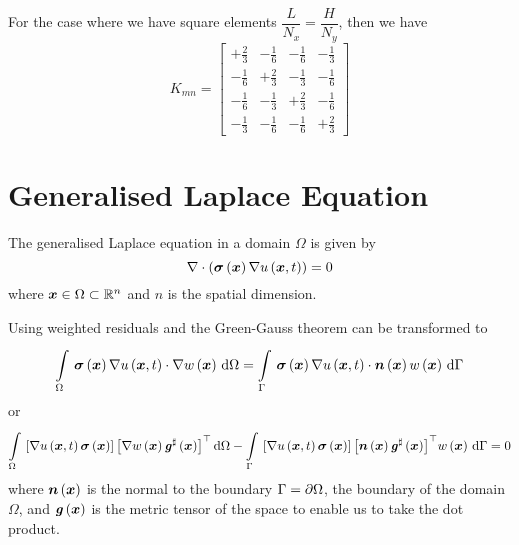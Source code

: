 For the case where we have square elements \ie $\dfrac{L}{N_{x}}=\dfrac{H}{N_{y}}$, then we have
\begin{equation}
  K_{mn}=\begin{bmatrix}
  +\frac{2}{3} & -\frac{1}{6} & -\frac{1}{6} & -\frac{1}{3} \\
  -\frac{1}{6} & +\frac{2}{3} & -\frac{1}{3} & -\frac{1}{6} \\
  -\frac{1}{6} & -\frac{1}{3} & +\frac{2}{3} & -\frac{1}{6} \\
  -\frac{1}{3} & -\frac{1}{6} & -\frac{1}{6} & +\frac{2}{3}
  \end{bmatrix}
  \label{eqn:FEMTwoDLaplaceSquareElementStiffnessMatrix}  
\end{equation}

\section{Generalised Laplace Equation}
\label{sec:ElementStiffnessMatrixGenLaplace}

The generalised Laplace equation in a domain $\Omega$ is given by  \ie
\begin{equation}
  \divergence{}{\pbrac{\fnof{\conductivitytensor}{\vectr{x}}\gradient{}{\fnof{u}{\vectr{x},t}}}}=0
\end{equation}
where $\vectr{x}\in\Omega\subset\rntopology{n}$ and $n$ is the spatial dimension.

Using weighted residuals and the Green-Gauss theorem
 can be transformed to
\begin{equation}
  \gint{\Omega}{}{\dotprod{\fnof{\conductivitytensor}{\vectr{x}}\gradient{}{\fnof{u}{\vectr{x},t}}}
    {\gradient{}{\fnof{w}{\vectr{x}}}}}{\Omega}=
  \gint{\Gamma}{}{\dotprod{\fnof{\conductivitytensor}{\vectr{x}}\gradient{}{\fnof{u}{\vectr{x},t}}}
    {\fnof{\normal}{\vectr{x}}}\fnof{w}{\vectr{x}}}{\Gamma}
\end{equation}
or
\begin{equation}
  \gint{\Omega}{}{\sqbrac{\gradient{}{\fnof{u}{\vectr{x},t}}\fnof{\conductivitytensor}{\vectr{x}}}
    \transpose{\sqbrac{\gradient{}{\fnof{w}{\vectr{x}}}\fnof{\sharptensor{\generalmetrictensor}}{\vectr{x}}}}}{\Omega}-
  \gint{\Gamma}{}{\sqbrac{\gradient{}{\fnof{u}{\vectr{x},t}}\fnof{\conductivitytensor}{\vectr{x}}}
    \transpose{\sqbrac{\fnof{\normal}{\vectr{x}}\fnof{\sharptensor{\generalmetrictensor}}{\vectr{x}}}}\fnof{w}{\vectr{x}}}{\Gamma}=0
  \label{eqn:ElementMatricesGenLaplaceStartingEqution}
\end{equation}
where $  \boldsymbol{n} \left(  \boldsymbol{x}  \right) $ is the normal to the boundary $\Gamma= \partial{\Omega} $, the boundary of the domain
$\Omega$, and $  \boldsymbol{\mathit{ g }} \left(  \boldsymbol{x}  \right) $ is the metric tensor of the space to enable us
to take the dot product.

